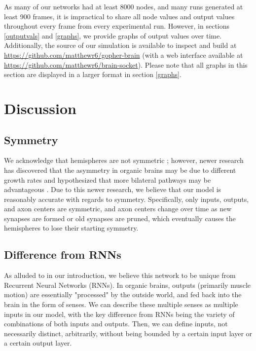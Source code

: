 \documentclass[12pt]{article}
\begin{document}
As many of our networks had at least 8000 nodes, and many runs generated at least 900 frames, it is impractical to share all node values and output values throughout every frame from every experimental run.  However, in sections \ref{outputvals} and \ref{graphs}, we provide graphs of output values over time.  Additionally, the source of our simulation is available to inspect and build at \url{https://github.com/matthewr6/gopher-brain} (with a web interface available at \url{https://github.com/matthewr6/brain-socket}).  Please note that all graphs in this section are displayed in a larger format in section \ref{graphs}.

\section{Discussion} \label{discussion}

\subsection{Symmetry} \label{symmetry}

We acknowledge that hemispheres are not symmetric \cite{hemisphereasymmetry}; however, newer research has discovered that the asymmetry in organic brains may be due to different growth rates \cite{hemispheredev} and hypothesized that more bilateral pathways may be advantageous \cite{recallasymmetry}.  Due to this newer research, we believe that our model is reasonably accurate with regards to symmetry.  Specifically, only inputs, outputs, and axon centers are symmetric, and axon centers change over time as new synapses are formed or old synapses are pruned, which eventually causes the hemispheres to lose their starting symmetry.

\subsection{Difference from RNNs} \label{rnndiff}

As alluded to in our introduction, we believe this network to be unique from Recurrent Neural Networks (RNNs).  In organic brains, outputs (primarily muscle motion) are essentially "processed" by the outside world, and fed back into the brain in the form of senses.  We can describe these multiple senses as multiple inputs in our model, with the key difference from RNNs being the variety of combinations of both inputs and outputs.  Then, we can define inputs, not necessarily distinct, arbitrarily, without being bounded by a certain input layer or a certain output layer.
\end{document}

